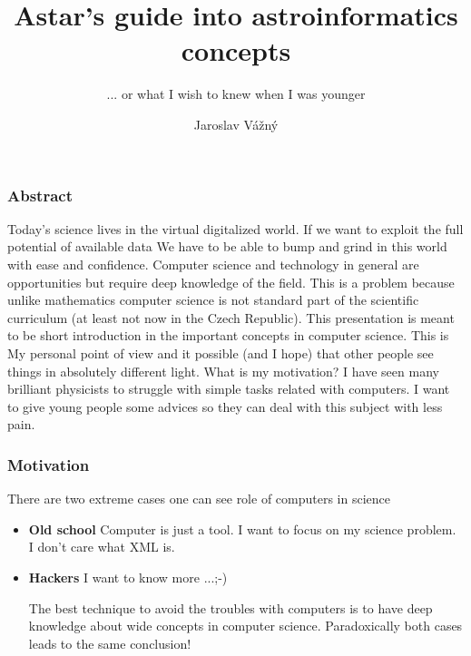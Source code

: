 \documentclass[fleqn]{beamer}
\title[VO \& Data Mining] %
{Astar's  guide into astroinformatics concepts}
\subtitle{... or what I wish to knew when I was younger} %
\author[Jaroslav Vážný] %
{Jaroslav Vážný }
\institute[Universities of Somewhere and Elsewhere] %
{

    Masarykova univerzita

}
\begin{document}
 




\begin{frame}
  \titlepage
\end{frame}




\begin{frame}\frametitle{Abstract}
\small{Today's science lives in the virtual digitalized world. If we
  want to exploit the full potential of available data We have to be
  able to bump and grind in this world with ease and confidence.
  Computer science and technology in general are opportunities but
  require deep knowledge of the field.  This is a problem because
  unlike mathematics computer science is not standard part of the
  scientific curriculum (at least not now in the Czech Republic). This
  presentation is meant to be short introduction in the important
  concepts in computer science.  This is My personal point of view and
  it possible (and I hope) that other people see things in absolutely
  different light. What is my motivation? I have seen many brilliant
  physicists to struggle with simple tasks related with computers. I
  want to give young people some advices so they can deal with this
  subject with less pain.}



\end{frame}


\begin{frame}\frametitle{Motivation}
  There are two extreme cases one can see role of computers in science
  \begin{itemize}
  \item \textbf{Old school} Computer is just a tool. I want to focus
    on my science problem. I don't care what XML is.
  \item \textbf{Hackers} I want to know more ...;-) 

\bigskip

The best technique to avoid the troubles with computers is to have deep
knowledge about wide concepts in computer science. Paradoxically both
cases leads to the same conclusion!
  \end{itemize}
\end{frame}
\end{document}
